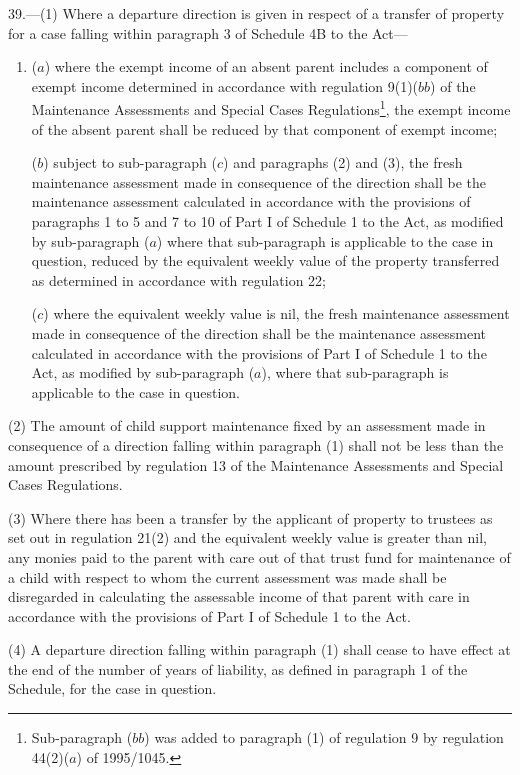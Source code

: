 \documentclass[a4paper]{article}
\begin{document}
39.—(1)
Where a departure direction is given in respect of a transfer of property for a
case falling within paragraph 3 of Schedule 4B to the Act—
\begin{enumerate}\item[]
($a$) where the exempt income of an absent parent includes a component of exempt
income determined in accordance with regulation 9(1)($bb$) of the Maintenance
Assessments and Special Cases Regulations\footnote{\frenchspacing Sub-paragraph ($bb$) was added to paragraph (1) of regulation 9 by regulation 44(2)($a$) of 1995/1045.}, the exempt income of the absent
parent shall be reduced by that component of exempt income;

($b$) subject to sub-paragraph ($c$) and paragraphs (2) and (3), the fresh
maintenance assessment made in consequence of the direction shall be the
maintenance assessment calculated in accordance with the provisions of
paragraphs 1 to 5 and 7 to 10 of Part I of Schedule 1 to the Act, as modified by
sub-paragraph ($a$) where that sub-paragraph is applicable to the case in
question, reduced by the equivalent weekly value of the property transferred as
determined in accordance with regulation 22;

($c$) where the equivalent weekly value is nil, the fresh maintenance assessment
made in consequence of the direction shall be the maintenance assessment
calculated in accordance with the provisions of Part I of Schedule 1 to the Act,
as modified by sub-paragraph ($a$), where that sub-paragraph is applicable to the
case in question.
\end{enumerate}

(2) The amount of child support maintenance fixed by an assessment made in
consequence of a direction falling within paragraph (1) shall not be less than
the amount prescribed by regulation 13 of the Maintenance Assessments and
Special Cases Regulations.

(3) Where there has been a transfer by the applicant of property to trustees as
set out in regulation 21(2) and the equivalent weekly value is greater than nil,
any monies paid to the parent with care out of that trust fund for maintenance
of a child with respect to whom the current assessment was made shall be
disregarded in calculating the assessable income of that parent with care in
accordance with the provisions of Part I of Schedule 1 to the Act.

(4) A departure direction falling within paragraph (1) shall cease to have
effect at the end of the number of years of liability, as defined in paragraph 1
of the Schedule, for the case in question.
\end{document}

